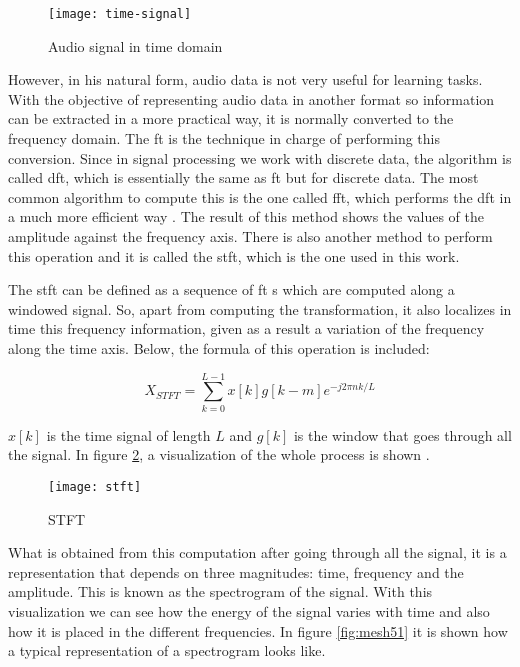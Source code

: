	\begin{figure}[H]
		\centering
		\captionsetup{justification=centering}
		\texttt{[image: time-signal]}
		\caption{Audio signal in time domain}
		\label{fig:mesh49}
	\end{figure}

	However, in his natural form, audio data is not very useful for learning tasks. With the objective of representing audio data in another format so information can be extracted in a more practical way, it is normally converted to the frequency domain. The \acrshort{ft} is the technique in charge of performing this conversion. Since in signal processing we work with discrete data, the algorithm is called \acrfull{dft}, which is essentially the same as \acrshort{ft} but for discrete data. The most common algorithm to compute this is the one called \acrfull{fft}, which performs the \acrshort{dft} in a much more efficient way \cite{Lei2016}. The result of this method shows the values of the amplitude against the frequency axis. There is also another method to perform this operation and it is called the \acrfull{stft}, which is the one used in this work.
	
	The \acrshort{stft} can be defined as a sequence of \acrshort{ft} s which are computed along a windowed signal. So, apart from computing the transformation, it also localizes in time this frequency information, given as a result a variation of the frequency along the time axis. Below, the formula of this operation is included:
	
	\[ X_{STFT} =  \sum_{k=0}^{L-1} x[k]g[k-m]e^{-j2\pi n k/L}\]
	
	$x[k]$ is the time signal of length $L$ and $g[k]$ is the window that goes through all the signal. In figure \ref{fig:mesh50}, a visualization of the whole process is shown \cite{Kehtarnavaz2008}.
	
	\begin{figure}[H]
		\centering
		\captionsetup{justification=centering}
		\texttt{[image: stft]}
		\caption{STFT \cite{Gao2006}}
		\label{fig:mesh50}
	\end{figure}

	What is obtained from this computation after going through all the signal, it is a representation that depends on three magnitudes: time, frequency and the amplitude. This is known as the spectrogram of the signal. With this visualization we can see how the energy of the signal varies with time and also how it is placed in the different frequencies. In figure \ref{fig:mesh51} it is shown how a typical representation of a spectrogram looks like. 
	
